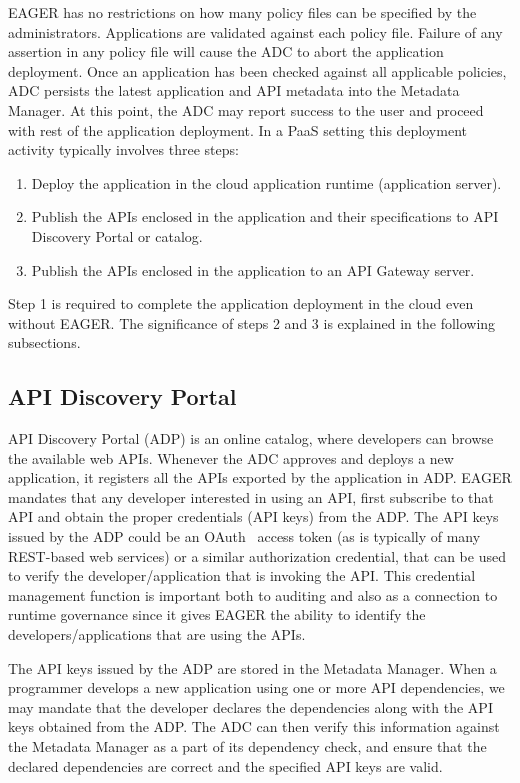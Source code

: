 EAGER has no restrictions on how many policy files can be specified by the
administrators. Applications are validated against each policy file. Failure
of any assertion in any policy file will cause the ADC to abort the
application deployment. Once an application has been checked against all
applicable policies, ADC persists the latest application and API metadata into
the Metadata Manager.  At this point, the ADC may report success to the user
and proceed with rest of the application deployment. In a PaaS setting
this deployment
activity typically involves three
steps:

\begin{enumerate}
\item Deploy the application in the cloud application runtime (application server).
\item Publish the APIs enclosed in the application and their specifications to
API Discovery Portal or catalog.
\item Publish the APIs enclosed in the application to an API Gateway server.
\end{enumerate}

Step 1 is required to complete the application deployment in the cloud even without EAGER. The significance of steps 2 and 3 is explained in the 
following subsections.

\subsection{API Discovery Portal} API Discovery Portal (ADP) is an online
catalog, where developers can browse the available web APIs. Whenever the ADC
approves and deploys a new application, it registers all the APIs exported by
the application in ADP.  EAGER mandates that any developer interested in using
an API, first subscribe to that API and obtain the proper credentials (API
keys) from the ADP. The API keys issued by the ADP could be an
OAuth~\cite{XXXOAuthXXXX} access
token (as is typically of many REST-based web services) 
or a similar authorization credential, that can be used to verify the
developer/application that is invoking the API. This credential management
function is
important both to auditing and also as a connection to
runtime governance since it gives EAGER the ability to identify
the developers/applications that are using the APIs. 

The API keys issued by the ADP are stored in the Metadata Manager. When a
programmer develops a new application using one or more API dependencies, we
may mandate that the developer declares the dependencies along with the API
keys obtained from the ADP. The ADC can then verify this information against
the Metadata Manager as a part of its dependency check, and ensure that the
declared dependencies are correct and the specified API keys are valid. 

